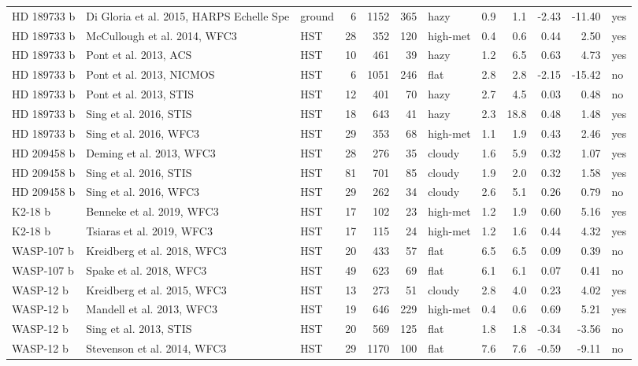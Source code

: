 \begin{table}[H]
\begin{tabular}{@{}lllrrrlrrrrl@{}}
HD 189733 b & Di Gloria et al. 2015, HARPS Echelle Spe & ground & 6 & 1152 & 365 & hazy & 0.9 & 1.1 & -2.43 & -11.40 & yes \\
HD 189733 b & McCullough et al. 2014, WFC3 & HST & 28 & 352 & 120 & high-met & 0.4 & 0.6 & 0.44 & 2.50 & yes \\
HD 189733 b & Pont et al. 2013, ACS & HST & 10 & 461 & 39 & hazy & 1.2 & 6.5 & 0.63 & 4.73 & yes \\
HD 189733 b & Pont et al. 2013, NICMOS & HST & 6 & 1051 & 246 & flat & 2.8 & 2.8 & -2.15 & -15.42 & no \\
HD 189733 b & Pont et al. 2013, STIS & HST & 12 & 401 & 70 & hazy & 2.7 & 4.5 & 0.03 & 0.48 & no \\
HD 189733 b & Sing et al. 2016, STIS & HST & 18 & 643 & 41 & hazy & 2.3 & 18.8 & 0.48 & 1.48 & yes \\
HD 189733 b & Sing et al. 2016, WFC3 & HST & 29 & 353 & 68 & high-met & 1.1 & 1.9 & 0.43 & 2.46 & yes \\
HD 209458 b & Deming et al. 2013, WFC3 & HST & 28 & 276 & 35 & cloudy & 1.6 & 5.9 & 0.32 & 1.07 & yes \\
HD 209458 b & Sing et al. 2016, STIS & HST & 81 & 701 & 85 & cloudy & 1.9 & 2.0 & 0.32 & 1.58 & yes \\
HD 209458 b & Sing et al. 2016, WFC3 & HST & 29 & 262 & 34 & cloudy & 2.6 & 5.1 & 0.26 & 0.79 & no \\
K2-18 b & Benneke et al. 2019, WFC3 & HST & 17 & 102 & 23 & high-met & 1.2 & 1.9 & 0.60 & 5.16 & yes \\
K2-18 b & Tsiaras et al. 2019, WFC3 & HST & 17 & 115 & 24 & high-met & 1.2 & 1.6 & 0.44 & 4.32 & yes \\
WASP-107 b & Kreidberg et al. 2018, WFC3 & HST & 20 & 433 & 57 & flat & 6.5 & 6.5 & 0.09 & 0.39 & no \\
WASP-107 b & Spake et al. 2018, WFC3 & HST & 49 & 623 & 69 & flat & 6.1 & 6.1 & 0.07 & 0.41 & no \\
WASP-12 b & Kreidberg et al. 2015, WFC3 & HST & 13 & 273 & 51 & cloudy & 2.8 & 4.0 & 0.23 & 4.02 & yes \\
WASP-12 b & Mandell et al. 2013, WFC3 & HST & 19 & 646 & 229 & high-met & 0.4 & 0.6 & 0.69 & 5.21 & yes \\
WASP-12 b & Sing et al. 2013, STIS & HST & 20 & 569 & 125 & flat & 1.8 & 1.8 & -0.34 & -3.56 & no \\
WASP-12 b & Stevenson et al. 2014, WFC3 & HST & 29 & 1170 & 100 & flat & 7.6 & 7.6 & -0.59 & -9.11 & no \\

\end{tabular}
\end{table}
